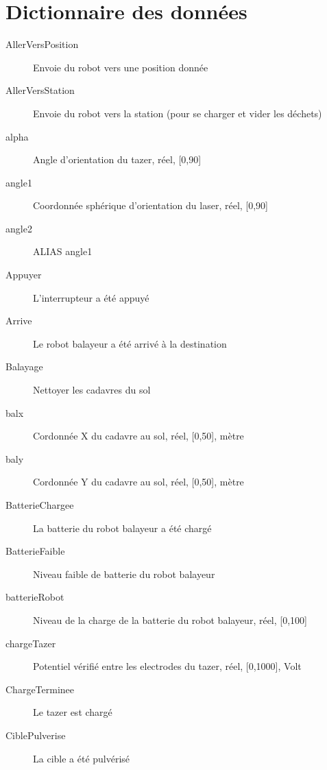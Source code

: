 \section {Dictionnaire des données}

\begin{description}
	
	\item [AllerVersPosition]\el
	Envoie du robot vers une position donnée

	\item [AllerVersStation]\el
	Envoie du robot vers la station (pour se charger et vider les déchets)
	\item [alpha]\el
	Angle d'orientation du tazer, réel, [0,90]

	\item [angle1]\el
	Coordonnée sphérique d'orientation du laser, réel, [0,90]

	\item [angle2]\el
	ALIAS angle1

	\item [Appuyer]\el
	L'interrupteur a été appuyé

	\item [Arrive]\el
	Le robot balayeur a été arrivé à la destination

	\item [Balayage]\el
	Nettoyer les cadavres du sol

	\item [balx]\el
	Cordonnée X du cadavre au sol, réel, [0,50], mètre

	\item [baly]\el
	Cordonnée Y du cadavre au sol, réel, [0,50], mètre

	\item [BatterieChargee]\el
	La batterie du robot balayeur a été chargé

	\item [BatterieFaible]\el
	Niveau faible de batterie du robot balayeur

	\item [batterieRobot]\el
	Niveau de la charge de la batterie du robot balayeur, réel, [0,100]

	\item [chargeTazer]\el
	Potentiel vérifié entre les electrodes du tazer, réel, [0,1000], Volt

	\item [ChargeTerminee]\el
	Le tazer est chargé

	\item [CiblePulverise]\el
	La cible a été pulvérisé


\end{description}
